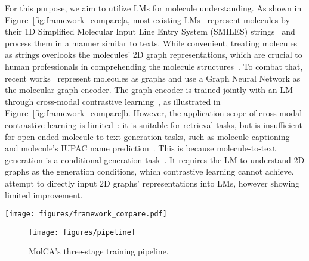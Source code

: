 \documentclass[11pt]{article}
\begin{document}
For this purpose, we aim to utilize LMs for molecule understanding. As shown in Figure~\ref{fig:framework_compare}a, most existing LMs~\citep{LLama, OPT, KVPLM} represent molecules by their 1D Simplified Molecular Input Line Entry System (SMILES) strings~\citep{SMILES} and process them in a manner similar to texts. While convenient, treating molecules as strings overlooks the molecules' 2D graph representations, which are crucial to human professionals in comprehending the molecule structures~\citep{wells2012structural}. To combat that, recent works~\citep{MoMu, MoleculeSTM} represent molecules as graphs and use a Graph Neural Network \citep[GNN;][]{xu2019powerful} as the molecular graph encoder. The graph encoder is trained jointly with an LM through cross-modal contrastive learning~\citep{CLIP,DeCLIP}, as illustrated in Figure~\ref{fig:framework_compare}b. 
However, the application scope of cross-modal contrastive learning is limited~\cite{Flamingo}: it is suitable for retrieval tasks, but is insufficient for open-ended molecule-to-text generation tasks, such as molecule captioning~\citep{MolT5} and molecule's IUPAC name prediction~\citep{Galactica}. This is because molecule-to-text generation is a conditional generation task~\cite{keskar2019ctrl, T5}. It requires the LM to understand 2D graphs as the generation conditions, which contrastive learning cannot achieve. 
~\citet{MoMu} attempt to directly input 2D graphs' representations into LMs, however showing limited improvement.

\begin{figure}
\end{figure}

\begin{figure*}[t!]
 \centering \small
 \texttt{[image: figures/framework\_compare.pdf]}
 \vspace{-2mm}
 \caption{Comparison of molecular language modeling methods.}
 \label{fig:framework_compare}
 \vspace{-4mm}
\end{figure*}


\begin{figure}[t]
 \centering\small
 \texttt{[image: figures/pipeline]}
 \vspace{-2mm}
 \caption{MolCA's three-stage training pipeline.}
 \vspace{-5mm}
\label{fig:pipeline}
\end{figure}
\end{document}
